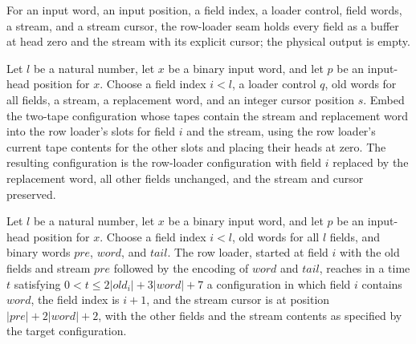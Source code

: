 \begin{definition}
\label{Complexity.clLoadCfg}
\leanok
{}
For an input word, an input position, a field index, a loader control, field words, a stream, and a stream cursor, the row-loader seam holds every field as a buffer at head zero and the stream with its explicit cursor; the physical output is empty.
\end{definition}

\begin{lemma}
\label{Complexity.clLoad_frame}
\leanok
{}
Let $l$ be a natural number, let $x$ be a binary input word, and let $p$ be an
input-head position for $x$. Choose a field index $i<l$, a loader control $q$, old words
for all fields, a stream, a replacement word, and an integer cursor position $s$. Embed
the two-tape configuration whose tapes contain the stream and replacement word into the
row loader’s slots for field $i$ and the stream, using the row loader’s current tape
contents for the other slots and placing their heads at zero. The resulting
configuration is the row-loader configuration with field $i$ replaced by the replacement
word, all other fields unchanged, and the stream and cursor preserved.
\end{lemma}

\begin{lemma}
\label{Complexity.clLoad_field}
\leanok
{}
Let $l$ be a natural number, let $x$ be a binary input word, and let $p$ be an
input-head position for $x$. Choose a field index $i<l$, old words for all $l$ fields,
and binary words $pre$, $word$, and $tail$. The row loader, started at field $i$ with
the old fields and stream $pre$ followed by the encoding of $word$ and $tail$, reaches
in a time $t$ satisfying $0<t\le 2|old_i|+3|word|+7$ a configuration in which field $i$
contains $word$, the field index is $i+1$, and the stream cursor is at position
$|pre|+2|word|+2$, with the other fields and the stream contents as specified by the
target configuration.
\end{lemma}

